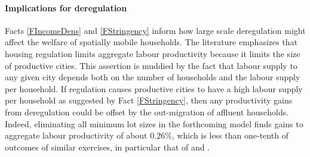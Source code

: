 \documentclass[12pt]{article}
\begin{document}
	
	
	\paragraph*{Implications for deregulation} Facts \ref{FIncomeDens} and \ref{FStringency} inform how large scale deregulation might affect the welfare of spatially mobile households. The literature emphasizes that housing regulation limits aggregate labour productivity because it limits the size of productive cities. This assertion is muddied by the fact that labour supply to any given city depends both on the number of households and the labour supply per household. If regulation causes productive cities to have a high labour supply per household as suggested by Fact \ref{FStringency}, then any productivity gains from deregulation could be offset by the out-migration of affluent households. Indeed, eliminating all minimum lot sizes in the forthcoming model finds gains to aggregate labour productivity of about $0.26 \%$, which is less than one-tenth of outcomes of similar exercises, in particular that of \cite{hseihmoretti} and \cite{durantonpugaurbgrowth}.  
	
\end{document}
